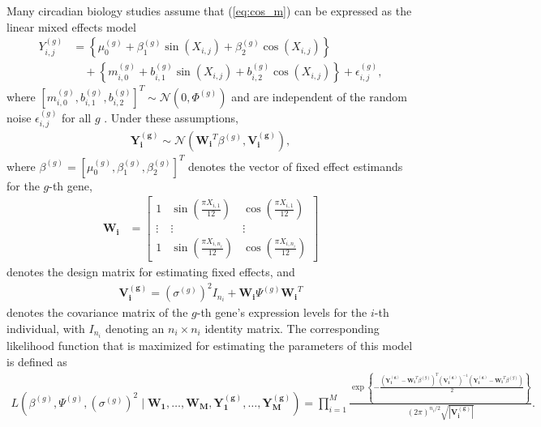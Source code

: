 Many circadian biology studies assume that (\ref{eq:cos_m}) can be expressed as the linear mixed effects model
\begin{align} \label{eq:lin_m}
    Y^{(g)}_{i,j} &= \left\{\mu^{(g)}_0+\beta^{(g)}_1\sin(X_{i,j})+\beta^{(g)}_2\cos(X_{i,j})\right\} \nonumber \\
    & \quad + \left\{m^{(g)}_{i,0}+b^{(g)}_{i,1}\sin(X_{i,j})+b^{(g)}_{i,2}\cos(X_{i,j}) \right\} + \epsilon^{(g)}_{i,j},
\end{align}
where $[m^{(g)}_{i,0}, b^{(g)}_{i,1}, b^{(g)}_{i,2}]^T \sim \mathcal{N}(0, \Phi^{(g)})$ and are independent of the random noise $\epsilon^{(g)}_{i,j}$ for all $g$ \citep{Archer2014, delolmo2022, Fontana2012, Hou2021, MllerLevet2013}. Under these assumptions,
\begin{align*}
    \boldsymbol{Y_i^{(g)}} \sim \mathcal{N}(\boldsymbol{W_i}^T\beta^{(g)}, \boldsymbol{V_i^{(g)}}),
\end{align*}
where $\beta^{(g)} =[{\mu}^{(g)}_0, {\beta}^{(g)}_1,  {\beta}^{(g)}_2]^T$ denotes the vector of fixed effect estimands for the $g$-th gene,
\begin{align*}
    \boldsymbol{W_i} &= \begin{bmatrix} 1 & \sin\left(\frac{\pi X_{i,1}}{12}\right) & \cos\left(\frac{\pi X_{i,1}}{12}\right) \\
    \vdots & \vdots & \vdots \\
    1 & \sin\left(\frac{\pi X_{i,n_i}}{12}\right) & \cos\left(\frac{\pi X_{i,n_i}}{12}\right)
    \end{bmatrix}
\end{align*}
denotes the design matrix for estimating fixed effects, and
\begin{align*}
\boldsymbol{V_i^{(g)}} = (\sigma^{(g)})^2I_{n_i} + \boldsymbol{W_i} \Psi^{(g)}\boldsymbol{W_i}^T
\end{align*}
denotes the covariance matrix of the $g$-th gene's expression levels for the $i$-th individual, with $I_{n_i}$ denoting an $n_i \times n_i$ identity matrix. The corresponding likelihood function that is maximized for estimating the parameters of this model is defined as
\begin{align*}
    L(\beta^{(g)}, \Psi^{(g)}, (\sigma^{(g)})^2 \mid  \boldsymbol{W_1},\ldots,\boldsymbol{W_M}, \boldsymbol{Y_1^{(g)}},\ldots,\boldsymbol{Y_M^{(g)}}) = \prod_{i=1}^M\frac{\exp\left\{-\frac{(\boldsymbol{Y_i^{(g)}}-\boldsymbol{W_i}^T\beta^{(g)})^T(\boldsymbol{V_i^{(g)}})^{-1}(\boldsymbol{Y_i^{(g)}}-\boldsymbol{W_i}^T\beta^{(g)})}{2} \right\}}{(2\pi)^{n_i/2} \sqrt{|\boldsymbol{V_i^{(g)}}|}}.
\end{align*}
